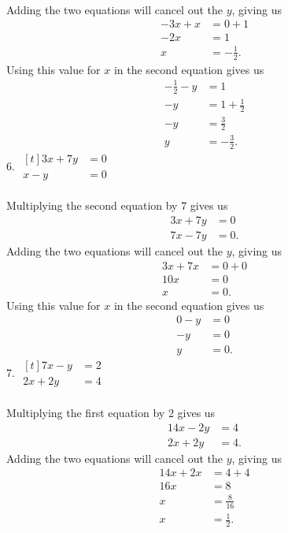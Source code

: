 \documentclass[12pt]{article}
\begin{document}
\\
Adding the two equations will cancel out the $y$, giving us
\begin{align*}
-3x+x&=0+1 \\
-2x&=1 \\
x&=-\displaystyle \frac{1}{2}.
\end{align*}
Using this value for $x$ in the second equation gives us
\begin{align*}
-\displaystyle \frac{1}{2}-y&=1 \\
-y&=1+\displaystyle \frac{1}{2} \\
-y&=\displaystyle \frac{3}{2} \\
y&=-\displaystyle \frac{3}{2}.
\end{align*}
6. $\begin{aligned}[t]
3x+7y&=0 \\
x-y&=0
\end{aligned}$ \\
\\
Multiplying the second equation by 7 gives us
\begin{align*}
3x+7y&=0 \\
7x-7y&=0.
\end{align*}
Adding the two equations will cancel out the $y$, giving us
\begin{align*}
3x+7x&=0+0 \\
10x&=0 \\
x&=0.
\end{align*}
Using this value for $x$ in the second equation gives us
\begin{align*}
0-y&=0 \\
-y&=0 \\
y&=0.
\end{align*}
7. $\begin{aligned}[t]
7x-y&=2 \\
2x+2y&=4
\end{aligned}$ \\
\\
Multiplying the first equation by 2 gives us
\begin{align*}
14x-2y&=4 \\
2x+2y&=4.
\end{align*}
Adding the two equations will cancel out the $y$, giving us
\begin{align*}
14x+2x&=4+4 \\
16x&=8 \\
x&=\displaystyle \frac{8}{16} \\
x&=\displaystyle \frac{1}{2}.
\end{align*}
\end{document}
